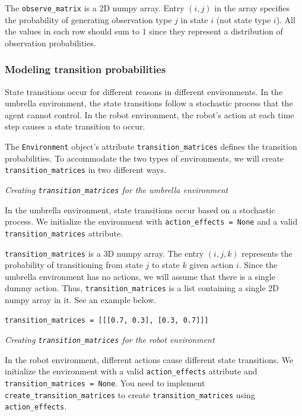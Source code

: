 \documentclass[12pt]{article}
\begin{document}
The \verb+observe_matrix+ is a 2D numpy array. Entry $(i,j)$ in the array specifies the probability of generating observation type $j$ in state $i$ (not state type $i$). All the values in each row should sum to $1$ since they represent a distribution of observation probabilities.

\subsubsection{Modeling transition probabilities}

State transitions occur for different reasons in different environments. In the umbrella environment, the state transitions follow a stochastic process that the agent cannot control. In the robot environment, the robot's action at each time step causes a state transition to occur. 

The \verb+Environment+ object's attribute \verb+transition_matrices+ defines the transition probabilities. To accommodate the two types of environments, we will create \verb+transition_matrices+ in two different ways.

{\em Creating \verb+transition_matrices+ for the umbrella environment}

In the umbrella environment, state transitions occur based on a stochastic process. We initialize the environment with \verb+action_effects = None+ and a valid \verb+transition_matrices+ attribute.

\verb+transition_matrices+ is a 3D numpy array. The entry $(i,j,k)$ represents the probability of transitioning from state $j$ to state $k$ given action $i$. Since the umbrella environment has no actions, we will assume that there is a single dummy action. Thus, \verb+transition_matrices+ is a list containing a single 2D numpy array in it. See an example below.

\begin{verbatim}
transition_matrices = [[[0.7, 0.3], [0.3, 0.7]]]
\end{verbatim}

{\em Creating \verb+transition_matrices+ for the robot environment}

In the robot environment, different actions cause different state transitions. We initialize the environment with a valid \verb+action_effects+ attribute and \verb+transition_matrices = None+. You need to implement \verb+create_transition_matrices+ to create \verb+transition_matrices+ using \verb+action_effects+.
\end{document}
